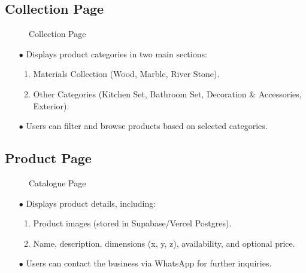 \documentclass[oneside,a4paper,12pt,explicit]{book}
\begin{document}
\subsection{Collection Page}
\begin{figure}[H]
    \centering
    \caption{Collection Page}
\end{figure}
\begin{enumerate}
    \item[$\bullet$] Displays product categories in two main sections:
    \begin{enumerate}
        \item Materials Collection (Wood, Marble, River Stone).
        \item Other Categories (Kitchen Set, Bathroom Set, Decoration & Accessories, Exterior).
    \end{enumerate}
    \item[$\bullet$] Users can filter and browse products based on selected categories.
\end{enumerate}

\subsection{Product Page}
\begin{figure}[H]
    \centering
    \caption{Catalogue Page}
\end{figure}
\begin{enumerate}
    \item[$\bullet$] Displays product details, including:
    \begin{enumerate}
        \item Product images (stored in Supabase/Vercel Postgres).
        \item Name, description, dimensions (x, y, z), availability, and optional price.
    \end{enumerate}
    \item[$\bullet$] Users can contact the business via WhatsApp for further inquiries.
\end{enumerate}
\end{document}
